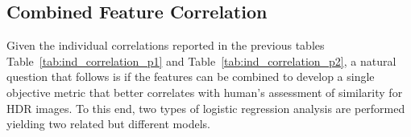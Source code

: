 \subsection{Combined Feature Correlation}

Given the individual correlations reported in the previous tables Table~\ref{tab:ind_correlation_p1} and Table~\ref{tab:ind_correlation_p2}, a natural question that follows is if the features can be combined to develop a single objective metric that better correlates with human’s assessment of similarity for HDR images. To this end, two types of logistic regression analysis are performed yielding two related but different models.




